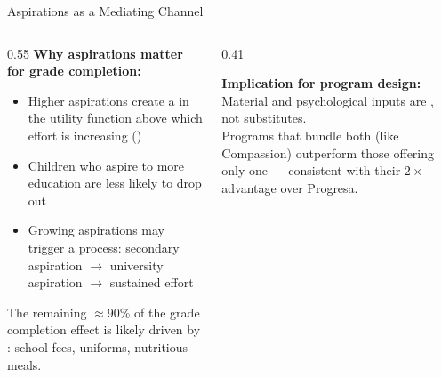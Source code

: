 \documentclass[aspectratio=169, 10pt]{beamer}
\begin{document}
\begin{frame}{Aspirations as a Mediating Channel}
  \begin{columns}
    \begin{column}{0.55\textwidth}
      \textbf{Why aspirations matter for grade completion:}
      \begin{itemize}
        \item Higher aspirations create a  in the utility function above which effort is increasing (\citealt{Lybbert2018})
        \item Children who aspire to more education are less likely to drop out
        \item Growing aspirations may trigger a  process: secondary aspiration $\to$ university aspiration $\to$ sustained effort
      \end{itemize}
      \vspace{0.4em}
      The remaining $\approx$90\% of the grade completion effect is likely driven by : school fees, uniforms, nutritious meals.
    \end{column}
    \begin{column}{0.41\textwidth}
      \begin{keybox}
        \textbf{Implication for program design:}\\[0.4em]
        Material and psychological inputs are , not substitutes.\\[0.5em]
        Programs that bundle both (like Compassion) outperform those offering only one --- consistent with their $2\times$ advantage over Progresa.
      \end{keybox}
    \end{column}
  \end{columns}
\end{frame}
\end{document}
